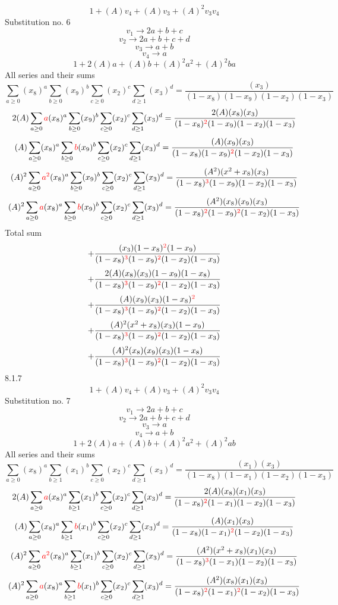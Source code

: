 \documentclass{article}
\begin{document}
\[1+(A)v_4+(A)v_3+(A)^2v_3v_4\]Substitution no. 6\[v_1\rightarrow{2a+b+c}\]\[v_2\rightarrow{2a+b+c+d}\]\[v_3\rightarrow{a+b}\]\[v_4\rightarrow{a}\]\[1+2(A)a+(A)b+(A)^2a^{2}+(A)^2ba\]All series and their sums\[\sum_{a\geq{0}}(x_8)^{a}\sum_{b\geq{0}}(x_9)^{b}\sum_{c\geq{0}}(x_2)^{c}\sum_{d\geq{1}}(x_3)^{d}=\frac{(x_3)}{(1-x_8)(1-x_9)(1-x_2)(1-x_3)}\]\[2(A)\sum_{a\geq{0}}\textcolor{red}{a}(x_8)^{a}\sum_{b\geq{0}}(x_9)^{b}\sum_{c\geq{0}}(x_2)^{c}\sum_{d\geq{1}}(x_3)^{d}=\frac{2(A)(x_8)(x_3)}{(1-x_8)^{\textcolor{red}{2}}(1-x_9)(1-x_2)(1-x_3)}\]\[(A)\sum_{a\geq{0}}(x_8)^{a}\sum_{b\geq{0}}\textcolor{red}{b}(x_9)^{b}\sum_{c\geq{0}}(x_2)^{c}\sum_{d\geq{1}}(x_3)^{d}=\frac{(A)(x_9)(x_3)}{(1-x_8)(1-x_9)^{\textcolor{red}{2}}(1-x_2)(1-x_3)}\]\[(A)^{2}\sum_{a\geq{0}}\textcolor{red}{a^{2}}(x_8)^{a}\sum_{b\geq{0}}(x_9)^{b}\sum_{c\geq{0}}(x_2)^{c}\sum_{d\geq{1}}(x_3)^{d}=\frac{(A^{2})(x^{2}+x_8)(x_3)}{(1-x_8)^{\textcolor{red}{3}}(1-x_9)(1-x_2)(1-x_3)}\]\[(A)^{2}\sum_{a\geq{0}}\textcolor{red}{a}(x_8)^{a}\sum_{b\geq{0}}\textcolor{red}{b}(x_9)^{b}\sum_{c\geq{0}}(x_2)^{c}\sum_{d\geq{1}}(x_3)^{d}=\frac{(A^{2})(x_8)(x_9)(x_3)}{(1-x_8)^{\textcolor{red}{2}}(1-x_9)^{\textcolor{red}{2}}(1-x_2)(1-x_3)}\]
Total sum
\[+\frac{(x_3)(1-x_8)^{\textcolor{red}{2}}(1-x_9)}{(1-x_8)^{\textcolor{red}{3}}(1-x_9)^{\textcolor{red}{2}}(1-x_2)(1-x_3)}\]\[+\frac{2(A)(x_8)(x_3)(1-x_9)(1-x_8)}{(1-x_8)^{\textcolor{red}{3}}(1-x_9)^{\textcolor{red}{2}}(1-x_2)(1-x_3)}\]\[+\frac{(A)(x_9)(x_3)(1-x_8)^{\textcolor{red}{2}}}{(1-x_8)^{\textcolor{red}{3}}(1-x_9)^{\textcolor{red}{2}}(1-x_2)(1-x_3)}\]\[+\frac{(A)^{2}(x^{2}+x_8)(x_3)(1-x_9)}{(1-x_8)^{\textcolor{red}{3}}(1-x_9)^{\textcolor{red}{2}}(1-x_2)(1-x_3)}\]\[+\frac{(A)^{2}(x_8)(x_9)(x_3)(1-x_8)}{(1-x_8)^{\textcolor{red}{3}}(1-x_9)^{\textcolor{red}{2}}(1-x_2)(1-x_3)}\]
8.1.7
\[1+(A)v_4+(A)v_3+(A)^2v_3v_4\]Substitution no. 7\[v_1\rightarrow{2a+b+c}\]\[v_2\rightarrow{2a+b+c+d}\]\[v_3\rightarrow{a}\]\[v_4\rightarrow{a+b}\]\[1+2(A)a+(A)b+(A)^2a^{2}+(A)^2ab\]All series and their sums\[\sum_{a\geq{0}}(x_8)^{a}\sum_{b\geq{1}}(x_1)^{b}\sum_{c\geq{0}}(x_2)^{c}\sum_{d\geq{1}}(x_3)^{d}=\frac{(x_1)(x_3)}{(1-x_8)(1-x_1)(1-x_2)(1-x_3)}\]\[2(A)\sum_{a\geq{0}}\textcolor{red}{a}(x_8)^{a}\sum_{b\geq{1}}(x_1)^{b}\sum_{c\geq{0}}(x_2)^{c}\sum_{d\geq{1}}(x_3)^{d}=\frac{2(A)(x_8)(x_1)(x_3)}{(1-x_8)^{\textcolor{red}{2}}(1-x_1)(1-x_2)(1-x_3)}\]\[(A)\sum_{a\geq{0}}(x_8)^{a}\sum_{b\geq{1}}\textcolor{red}{b}(x_1)^{b}\sum_{c\geq{0}}(x_2)^{c}\sum_{d\geq{1}}(x_3)^{d}=\frac{(A)(x_1)(x_3)}{(1-x_8)(1-x_1)^{\textcolor{red}{2}}(1-x_2)(1-x_3)}\]\[(A)^{2}\sum_{a\geq{0}}\textcolor{red}{a^{2}}(x_8)^{a}\sum_{b\geq{1}}(x_1)^{b}\sum_{c\geq{0}}(x_2)^{c}\sum_{d\geq{1}}(x_3)^{d}=\frac{(A^{2})(x^{2}+x_8)(x_1)(x_3)}{(1-x_8)^{\textcolor{red}{3}}(1-x_1)(1-x_2)(1-x_3)}\]\[(A)^{2}\sum_{a\geq{0}}\textcolor{red}{a}(x_8)^{a}\sum_{b\geq{1}}\textcolor{red}{b}(x_1)^{b}\sum_{c\geq{0}}(x_2)^{c}\sum_{d\geq{1}}(x_3)^{d}=\frac{(A^{2})(x_8)(x_1)(x_3)}{(1-x_8)^{\textcolor{red}{2}}(1-x_1)^{\textcolor{red}{2}}(1-x_2)(1-x_3)}\]
\end{document}
